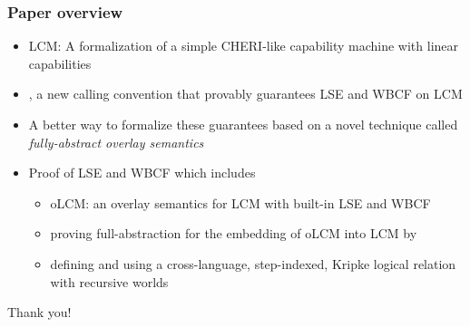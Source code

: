 \documentclass[aspectratio=169]{beamer}
\begin{document}
\begin{frame}
  \frametitle{Paper overview}
\begin{itemize}
\item LCM: A formalization of a simple CHERI-like capability machine with linear capabilities
\item \stktokens{}, a new calling convention that provably guarantees LSE and WBCF on LCM
\item A better way to formalize these guarantees based on a novel technique called \textit{fully-abstract overlay semantics}
\item Proof of LSE and WBCF which includes
  \begin{itemize}
  \item oLCM: an overlay semantics for LCM with built-in LSE and WBCF
  \item proving full-abstraction for the embedding of oLCM into LCM by
  \item defining and using a cross-language, step-indexed, Kripke logical relation with recursive worlds
  \end{itemize}
\end{itemize}
\end{frame}

\begin{frame}
  \centering
  Thank you!
\end{frame}

\appendix
\end{document}
